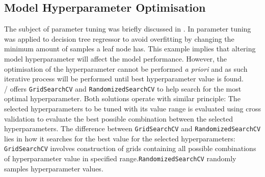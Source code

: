 \pagebreak

\subsection{Model Hyperparameter Optimisation}\label{sec:hpo}

The subject of parameter tuning was briefly discussed in . In  parameter tuning was applied to decision tree regressor to avoid overfitting by changing the minimum amount of samples a leaf node has. This example implies that altering model hyperparameter will affect the model performance. However, the optimisation of the hyperparameter cannot be performed \emph{a priori} and as such iterative process will be performed until best hyperparameter value is found.\\ 


\scikit/ offers {\tt GridSearchCV} and {\tt RandomizedSearchCV} to help search for the most optimal hyperparameter. Both solutions operate with similar principle: The selected hyperparameters to be tuned with its value range is evaluated using cross validation to evaluate the best possible combination between the selected hyperparameters. The difference between {\tt GridSearchCV} and {\tt RandomizedSearchCV} lies in how it searches for the best value for the selected hyperparameters: {\tt GridSearchCV} involves construction of grids containing all possible combinations of hyperparameter value in specified range.{\tt RandomizedSearchCV} randomly samples hyperparameter values.\\ 

